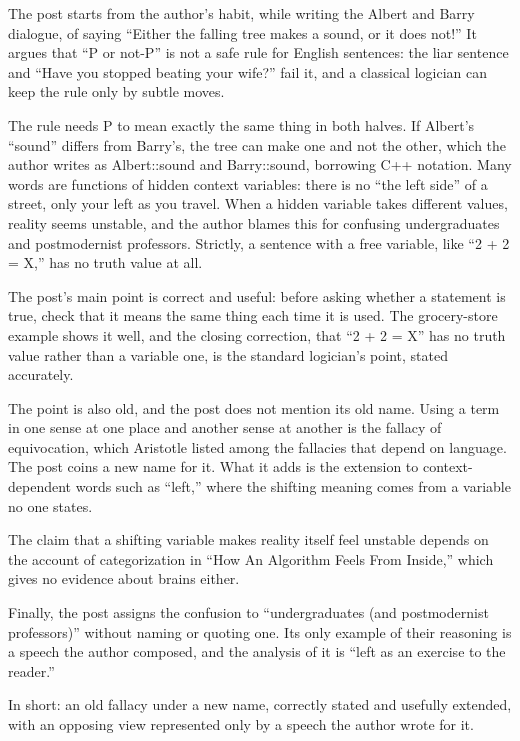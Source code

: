 \begin{afterword}
\summaryhead

The post starts from the author's habit, while writing the Albert and Barry dialogue, of saying ``Either the falling tree makes a sound, or it does not!'' It argues that ``P or not-P'' is not a safe rule for English sentences: the liar sentence and ``Have you stopped beating your wife?'' fail it, and a classical logician can keep the rule only by subtle moves.

The rule needs P to mean exactly the same thing in both halves. If Albert's ``sound'' differs from Barry's, the tree can make one and not the other, which the author writes as Albert::sound and Barry::sound, borrowing C++ notation. Many words are functions of hidden context variables: there is no ``the left side'' of a street, only your left as you travel. When a hidden variable takes different values, reality seems unstable, and the author blames this for confusing undergraduates and postmodernist professors. Strictly, a sentence with a free variable, like ``2 + 2 = X,'' has no truth value at all.

\responsehead

The post's main point is correct and useful: before asking whether a statement is true, check that it means the same thing each time it is used. The grocery-store example shows it well, and the closing correction, that ``2 + 2 = X'' has no truth value rather than a variable one, is the standard logician's point, stated accurately.

The point is also old, and the post does not mention its old name. Using a term in one sense at one place and another sense at another is the fallacy of equivocation, which Aristotle listed among the fallacies that depend on language. The post coins a new name for it. What it adds is the extension to context-dependent words such as ``left,'' where the shifting meaning comes from a variable no one states.

The claim that a shifting variable makes reality itself feel unstable depends on the account of categorization in ``How An Algorithm Feels From Inside,'' which gives no evidence about brains either.

Finally, the post assigns the confusion to ``undergraduates (and postmodernist professors)'' without naming or quoting one. Its only example of their reasoning is a speech the author composed, and the analysis of it is ``left as an exercise to the reader.''

In short: an old fallacy under a new name, correctly stated and usefully extended, with an opposing view represented only by a speech the author wrote for it.
\end{afterword}
